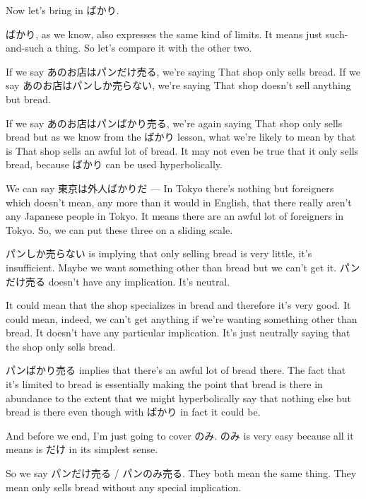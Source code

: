 Now let's bring in ばかり.

\stopsectionlevel

\startsectionlevel[title={ばかり},reference={ばかり}]

ばかり, as we know, also expresses the same kind of limits. It means just such-and-such a thing. So let's compare it with the other two.

If we say あのお店はパンだけ売る, we're saying That shop only sells bread. If we say あのお店はパンしか売らない, we're saying That shop doesn't sell anything but bread.

If we say あのお店はパンばかり売る, we're again saying That shop only sells bread but as we know from the ばかり lesson, what we're likely to mean by that is That shop sells an awful lot of bread. It may not even be true that it only sells bread, because ばかり can be used hyperbolically.

We can say 東京は外人ばかりだ --- In Tokyo there's nothing but foreigners which doesn't mean, any more than it would in English, that there really aren't any Japanese people in Tokyo. It means there are an awful lot of foreigners in Tokyo. So, we can put these three on a sliding scale.

{}

パンしか売らない is implying that only selling bread is very little, it's insufficient. Maybe we want something other than bread but we can't get it. パンだけ売る doesn't have any implication. It's neutral.

It could mean that the shop specializes in bread and therefore it's very good. It could mean, indeed, we can't get anything if we're wanting something other than bread. It doesn't have any particular implication. It's just neutrally saying that the shop only sells bread.

パンばかり売る implies that there's an awful lot of bread there. The fact that it's limited to bread is essentially making the point that bread is there in abundance to the extent that we might hyperbolically say that nothing else but bread is there even though with ばかり in fact it could be.

\stopsectionlevel

\startsectionlevel[title={のみ},reference={のみ}]

And before we end, I'm just going to cover のみ. のみ is very easy because all it means is だけ in its simplest sense.

So we say パンだけ売る / パンのみ売る. They both mean the same thing. They mean only sells bread without any special implication.

